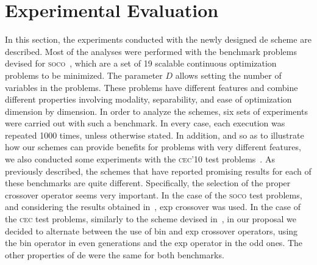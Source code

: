 \documentclass[preprint,3p]{elsarticle}
\newcommand{\DE}{{\sc de}}
\newcommand{\METCO}{\mbox{\sc{metco}}{}}
\begin{document}
\section{Experimental Evaluation}
\label{sec:exp}

In this section, the experiments conducted with the newly designed \DE{} scheme are described.
%
%
Most of the analyses were performed with the
benchmark problems devised for \textsc{soco}~\cite{Lozano:10}, which are a
set of 19 scalable continuous optimization problems to be minimized.
%
The parameter $D$ allows setting the number of variables in the problems.
%
These problems have different features and combine different properties
involving modality, separability, and ease of optimization dimension by dimension.
%
In order to analyze the schemes, six sets of experiments were carried out with such a benchmark.
%
In every case,
each execution was repeated 1000 times, unless otherwise stated.
%
In addition, and so as to illustrate how our schemes can provide benefits for problems with very different features,
we also conducted some experiments with the \textsc{cec'10} test problems~\cite{Tang:10}.
%
As previously described, the schemes that have reported promising results for each of these benchmarks are quite different.
%
Specifically, the selection of the proper crossover operator seems very important.
%
In the case of the \textsc{soco} test problems, and considering the results obtained in~\cite{LaTorre:11},
exp crossover was used.
%
In the case of the \textsc{cec} test problems,  similarly to the scheme devised in~\cite{Brest:10}, in our proposal we decided to
alternate between the use of bin and exp crossover operators,
using the bin operator in even generations and the exp operator
in the odd ones.
%
The other properties of \DE{} were the same for both benchmarks.
\end{document}
